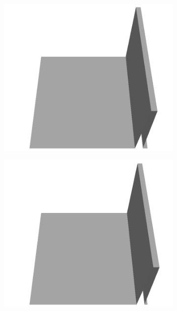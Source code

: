 \documentclass[../document.tex]{subfiles}
\begin{document}
\begin{figure}[H]
\begin{subfigure}[b]{0.065\textwidth}
    \includegraphics[width=\linewidth]{../img/5/custom_patches/walls_front/all/07-3d.png}
    \end{subfigure}
    \begin{subfigure}[b]{0.065\textwidth}
    \includegraphics[width=\linewidth]{../img/5/custom_patches/walls_front/all/06-3d.png}
    \end{subfigure}
    \begin{subfigure}[b]{0.065\textwidth}

\end{subfigure}
\end{figure}
\end{document}
